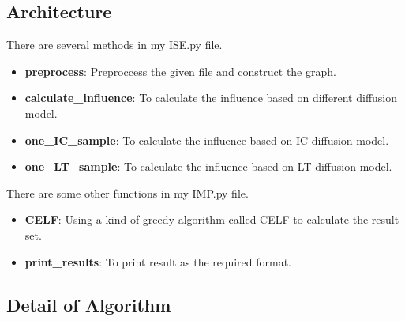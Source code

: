 \documentclass[conference,compsoc]{IEEEtran}
\begin{document}
\subsection{Architecture}
There are several methods in my ISE.py file.

\begin{itemize}
\item \textbf{preprocess}: Preproccess the given file and construct the graph.

\item \textbf{calculate\_{influence}}: To calculate the influence based on different diffusion model.

\item \textbf{one\_{IC\_{sample}}}: To calculate the influence based on IC diffusion model.

\item \textbf{one\_{LT\_{sample}}}: To calculate the influence based on LT diffusion model.

\end{itemize}

There are some other functions in my IMP.py file.
\begin{itemize}
\item \textbf{CELF}: Using a kind of greedy algorithm called CELF to calculate the result set.

\item \textbf{print\_{results}}: To print result as the required format.
\end{itemize}
\subsection{Detail of Algorithm}
\end{document}

